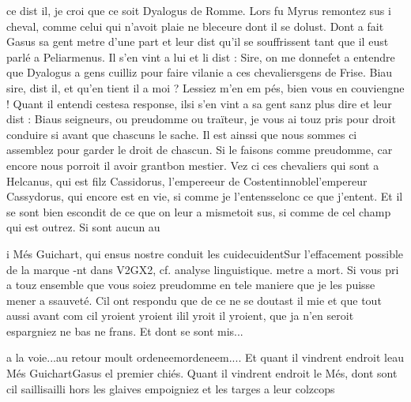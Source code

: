 \documentclass{article}
\begin{document}
\begin{pages}
                           ce dist il, je croi que ce soit Dyalogus de
                     Romme. Lors fu Myrus remontez sus i cheval, comme celui qui
               n’avoit plaie ne bleceure dont il se dolust. Dont a fait Gasus sa gent metre d’une part et leur dist qu’il se souffrissent tant que il eust parlé a Peliarmenus. Il s’en vint a lui et li dist
               : Sire, on me 
                     donnefet a entendre que Dyalogus a gens cuilliz
                  pour faire vilanie a ces 
                     chevaliersgens de Frise.
               Biau sire, dist il, et qu’en tient il a moi ?
                  Lessiez m’en em pés, bien vous en couviengne ! \pend
            \pstart Quant il entendi 
                  cestesa response, 
                  ilsi s’en vint a sa gent sanz plus dire et leur dist : Biaus seigneurs, ou preudomme ou traïteur, je vous ai touz pris pour
                  droit conduire si avant que chascuns le sache. Il est ainssi que nous sommes ci
                  assemblez pour garder le droit de chascun. Si le faisons comme preudomme, car
                  encore nous porroit il avoir 
                     grantbon mestier. Vez ci ces chevaliers qui sont a Helcanus, qui est filz 
                     Cassidorus, l’empereeur
                        de Costentinnoblel'empereur Cassydorus, qui encore est en vie, 
                     si comme je l’entensselonc ce que j'entent. Et il se sont bien escondit de ce que on leur 
                     a mismetoit sus, si comme de cel champ qui est outrez. Si sont aucun au 
                     
                     i
                  Més Guichart, qui 
                     ensus nostre conduit les 
                     cuidecuidentSur l'effacement possible de la marque -nt dans
                     V2GX2, cf. analyse linguistique. metre a mort. Si vous pri a touz
                  ensemble que vous soiez preudomme en tele maniere que je les puisse mener a
                  ssauveté. Cil ont respondu que de ce ne
                  se doutast il mie et que tout aussi avant com 
                     cil yroient yroient ilil yroit il yroient, que ja n’en seroit espargniez ne bas ne frans. Et dont
               se sont 
                  mis...
               
                  a la voie...au retour moult 
                  ordeneemordeneem.... 
                  Et quant il vindrent 
                        endroit leau
                     Més GuichartGasus el premier chiés. Quant il vindrent endroit le Més, dont sont cil 
                  saillisailli hors les glaives empoigniez et les targes a leur 
                  colzcops
               

\end{pages}
\end{document}
